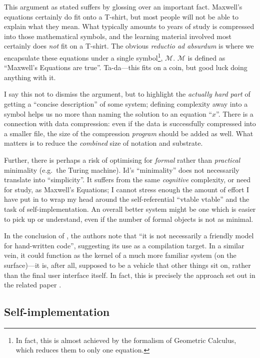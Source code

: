 This argument as stated suffers by glossing over an important fact.
Maxwell's equations certainly do fit onto a T-shirt, but most people
will not be able to explain what they mean. What typically amounts to
years of study is compressed into those mathematical symbols, and the
learning material involved most certainly does \emph{not} fit on a
T-shirt. The obvious \emph{reductio ad absurdum} is where we encapsulate
these equations under a single symbol\footnote{In fact, this is almost
  achieved by the formalism of Geometric Calculus, which reduces them to
  only one equation.}, \(\mathcal{M}\). \(\mathcal{M}\) is defined as
``Maxwell's Equations are true''. Ta-da---this fits on a coin, but good
luck doing anything with it.

I say this not to dismiss the argument, but to highlight the
\emph{actually hard part} of getting a ``concise description'' of some
system; defining complexity away into a symbol helps us no more than
naming the solution to an equation ``\(x\)''. There is a connection with
data compression: even if the data is successfully compressed into a
smaller file, the size of the compression \emph{program} should be added
as well. What matters is to reduce the \emph{combined} size of notation
and substrate.

Further, there is perhaps a risk of optimising for \emph{formal} rather
than \emph{practical} minimality (e.g.~the Turing machine). Id{}'s
``minimality'' does not necessarily translate into ``simplicity''. It
suffers from the same \emph{cognitive} complexity, or need for study, as
Maxwell's Equations; I cannot stress enough the amount of effort I have
put in to wrap my head around the self-referential ``vtable vtable'' and
the task of self-implementation. An overall better system might be one
which is easier to pick up or understand, even if the number of formal
objects is not as minimal.

In the conclusion of \cite{OROM}, the authors note that ``it is not
necessarily a friendly model for hand-written code'', suggesting its use
as a compilation target. In a similar vein, it could function as the
kernel of a much more familiar system (on the surface)---it is, after
all, supposed to be a vehicle that other things sit on, rather than the
final user interface itself. In fact, this is precisely the approach set
out in the related paper \cite{COLAs}.

\hypertarget{self-implementation}{%
\subsection{Self-implementation}\label{self-implementation}}


